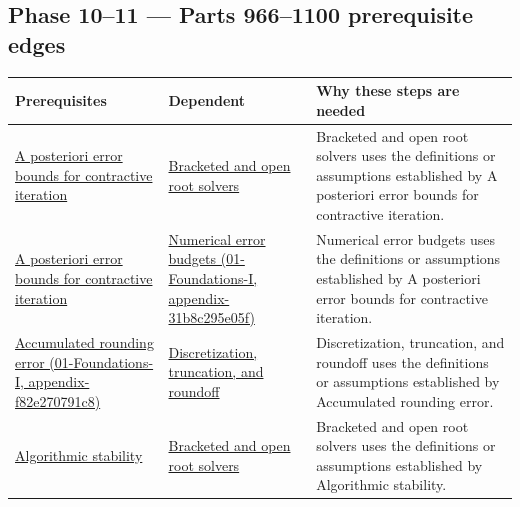 \subsection{Phase 10--11 --- Parts 966--1100 prerequisite edges}\label{appendix-4ad47bdd269a-phase-1011-parts-9661100-prerequisite-edges}

{\def\LTcaptype{none} %
\begin{longtable}[]{@{}
  >{\raggedright\arraybackslash}p{}
  >{\raggedright\arraybackslash}p{}
  >{\raggedright\arraybackslash}p{}@{}}
\toprule\noalign{}
\begin{minipage}[b]{\linewidth}\raggedright
Prerequisites
\end{minipage} & \begin{minipage}[b]{\linewidth}\raggedright
Dependent
\end{minipage} & \begin{minipage}[b]{\linewidth}\raggedright
Why these steps are needed
\end{minipage} \\
\midrule\noalign{}
\endhead
\bottomrule\noalign{}
\endlastfoot
\hyperref[appendix-d83b0ad1be7f]{A posteriori error bounds for contractive iteration} & \hyperref[appendix-f63eb850796d]{Bracketed and open root solvers} & Bracketed and open root solvers uses the definitions or assumptions established by A posteriori error bounds for contractive iteration. \\
\hyperref[appendix-d83b0ad1be7f]{A posteriori error bounds for contractive iteration} & \href{../01-Foundations-I/main.pdf\#nameddest=appendix-31b8c295e05f}{Numerical error budgets (01-Foundations-I, appendix-31b8c295e05f)} & Numerical error budgets uses the definitions or assumptions established by A posteriori error bounds for contractive iteration. \\
\href{../01-Foundations-I/main.pdf\#nameddest=appendix-f82e270791c8}{Accumulated rounding error (01-Foundations-I, appendix-f82e270791c8)} & \hyperref[appendix-6b0648b2b8e8]{Discretization, truncation, and roundoff} & Discretization, truncation, and roundoff uses the definitions or assumptions established by Accumulated rounding error. \\
\hyperref[appendix-aa2bf0d79639]{Algorithmic stability} & \hyperref[appendix-f63eb850796d]{Bracketed and open root solvers} & Bracketed and open root solvers uses the definitions or assumptions established by Algorithmic stability. \\

\end{longtable}}
